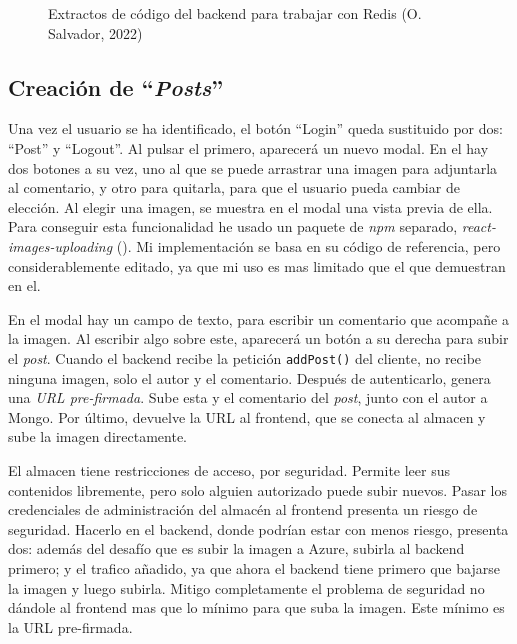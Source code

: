 \documentclass[11pt]{article}
\begin{document}
\begin{flushleft}
\begin{figure}[htb]
			\caption{Extractos de código del backend para trabajar con Redis (O. Salvador, 2022)}
			\label{extractos_redis}
		\end{figure}
  
  \bigskip
  \bigskip
  
	\subsection{Creación de ``\textit{Posts}''}
	Una vez el usuario se ha identificado, el botón ``Login'' queda sustituido por dos: ``Post'' y ``Logout''. Al pulsar el primero, aparecerá un nuevo modal. En el hay dos botones a su vez, uno al que se puede arrastrar una imagen para adjuntarla al comentario, y otro para quitarla, para que el usuario pueda cambiar de elección. Al elegir una imagen, se muestra en el modal una vista previa de ella.  Para conseguir esta funcionalidad he usado un paquete de \textit{npm} separado, \textit{react-images-uploading} (\cite{react_imgs}). Mi implementación se basa en su código de referencia, pero considerablemente editado, ya que mi uso es mas limitado que el que demuestran en el.
	\linebreak
	
	En el modal hay un campo de texto, para escribir un comentario que acompañe a la imagen. Al escribir algo sobre este, aparecerá un botón a su derecha para subir el \textit{post}. Cuando el backend recibe la petición \texttt{addPost()} del cliente, no recibe ninguna imagen, solo el autor y el comentario. Después de autenticarlo, genera una \textit{URL pre-firmada}. Sube esta y el comentario del \textit{post}, junto con el autor a Mongo. Por último, devuelve la URL al frontend, que se conecta al almacen y sube la imagen directamente.
	\linebreak
	
	El almacen tiene restricciones de acceso, por seguridad. Permite leer sus contenidos libremente, pero solo alguien autorizado puede subir nuevos. Pasar los credenciales de administración del almacén al frontend presenta un riesgo de seguridad. Hacerlo en el backend, donde podrían estar con menos riesgo, presenta dos: además del desafío que es subir la imagen a Azure, subirla al backend primero; y el trafico añadido, ya que ahora el backend tiene primero que bajarse la imagen y luego subirla. Mitigo completamente el problema de seguridad no dándole al frontend mas que lo mínimo para que suba la imagen. Este mínimo es la URL pre-firmada.
	\linebreak
	

\end{flushleft}
\end{document}
